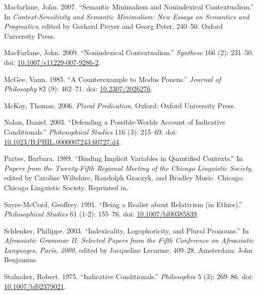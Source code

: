 \documentclass[
  10pt,
  letterpaper,
  DIV=11,
  numbers=noendperiod,
  twoside]{scrartcl}
\newlength{\cslhangindent}
\newenvironment{CSLReferences}[2] %
 {\begin{list}{}{%
  \setlength{\itemindent}{0pt}
  \setlength{\leftmargin}{0pt}
  \setlength{\parsep}{0pt}
  \ifodd #1
   \setlength{\leftmargin}{\cslhangindent}
   \setlength{\itemindent}{-1\cslhangindent}
  \fi
  \setlength{\itemsep}{#2\baselineskip}}}
 {\end{list}}
\begin{document}
\begin{CSLReferences}{1}{0}
Macfarlane, John. 2007. {``Semantic Minimalism and Nonindexical
Contextualism.''} In \emph{Context-Sensitivity and Semantic Minimalism:
New Essays on Semantics and Pragmatics}, edited by Gerhard Preyer and
Georg Peter, 240--50. Oxford University Press.

MacFarlane, John. 2009. {``{Nonindexical Contextualism}.''}
\emph{Synthese} 166 (2): 231--50. doi:
\href{https://doi.org/10.1007/s11229-007-9286-2}{10.1007/s11229-007-9286-2}.

McGee, Vann. 1985. {``A Counterexample to Modus Ponens.''} \emph{Journal
of Philosophy} 82 (9): 462--71. doi:
\href{https://doi.org/10.2307/2026276}{10.2307/2026276}.

McKay, Thomas. 2006. \emph{Plural Predication}. Oxford: Oxford
University Press.

Nolan, Daniel. 2003. {``{Defending a Possible-Worlds Account of
Indicative Conditionals}.''} \emph{Philosophical Studies} 116 (3):
215--69. doi:
\href{https://doi.org/10.1023/B:PHIL.0000007243.60727.d4}{10.1023/B:PHIL.0000007243.60727.d4}.

Partee, Barbara. 1989. {``Binding Implicit Variables in Quantified
Contexts.''} In \emph{Papers from the Twenty-Fifth Regional Meeting of
the Chicago Linguistic Society}, edited by Caroline Wiltshire, Randolph
Graczyk, and Bradley Music. Chicago: Chicago Linguistic Society.
Reprinted in\cite{Partee2004}.

Sayre-McCord, Geoffrey. 1991. {``Being a Realist about Relativism (in
Ethics).''} \emph{Philosophical Studies} 61 (1-2): 155--76. doi:
\href{https://doi.org/10.1007/bf00385839}{10.1007/bf00385839}.

Schlenker, Philippe. 2003. {``Indexicality, Logophoricity, and Plural
Pronouns.''} In \emph{Afroasiatic Grammar II: Selected Papers from the
Fifth Conference on Afroasiatic Languages, Paris, 2000}, edited by
Jacqueline Lecarme, 409--28. Amsterdam: John Benjamins.

Stalnaker, Robert. 1975. {``{Indicative Conditionals}.''}
\emph{Philosophia} 5 (3): 269--86. doi:
\href{https://doi.org/10.1007/bf02379021}{10.1007/bf02379021}.


\end{CSLReferences}
\end{document}
